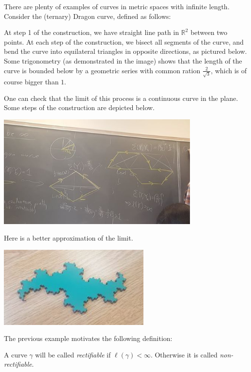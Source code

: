 \documentclass[12pt]{amsart}
\begin{document}

\begin{example}
There are plenty of examples of curves in metric spaces with infinite length. Consider the (ternary) Dragon curve, defined as follows:

At step 1 of the construction, we have  straight line path in $\mathbb{R}^2$ between two points. At each step of the construction, we bisect all segments of the curve, and bend the curve into equilateral triangles in opposite directions, as pictured below. Some trigonometry (as demonstrated in the image) shows that the length of the curve is bounded below by a geometric series with common ration $\frac{2}{\sqrt{3}}$, which is of course bigger than $1$.

One can check that the limit of this process is a continuous curve in the plane. Some steps of the construction are depicted below.
\begin{center}
  \includegraphics[width=4in]{2018-08-22-Dragon1}
\end{center}

\pagebreak[2]
Here is a better approximation of the limit.
\begin{center}
  \includegraphics[width=3in]{2018-08-22-Dragon2}
\end{center}
\end{example}


The previous example motivates the following definition:

\begin{definition} A curve $\gamma$ will be called \textit{rectifiable} if $\ell (\gamma) < \infty$. Otherwise it is called \textit{non-rectifiable}.

\end{definition}
\end{document}
